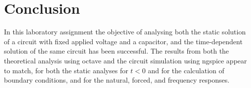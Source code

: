 \section{Conclusion}
\label{sec:conclusion}

In this laboratory assignment the objective of analysing both the static solution
of a circuit with fixed applied voltage and a capacitor, and the time-dependent solution
of the same circuit has been successful.
The results from both the theoretical analysis using octave and the circuit
simulation using ngspice appear to match, for both the static analyses for $t<0$ and
for the calculation of boundary conditions, and for the natural, forced, and frequency responses.

